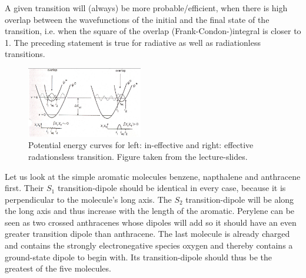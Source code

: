 \documentclass[10pt]{article}
\begin{document}
A given transition will (always) be more probable/efficient, when there is high overlap between the wavefunctions of the initial and the final state of the transition, i.e. when the square of the overlap (Frank-Condon-)integral is closer to 1. The preceding statement is true for radiative as well as radiationless transitions.
\begin{figure}[!h]
\begin{centering}
\includegraphics[width=0.45\textwidth]{f3}
\caption{Potential energy curves for left: in-effective and right: effective radationsless transition. Figure taken from the lecture-slides.}
\end{centering}
\end{figure}

Let us look at the simple aromatic molecules benzene, napthalene and anthracene first. Their $S_1$ transition-dipole should be identical in every case, because it is perpendicular to the molecule's long axis. The $S_2$ transition-dipole will be along the long axis and thus increase with the length of the aromatic. Perylene can be seen as two crossed anthracenes whose dipoles will add so it should have an even greater transition dipole than anthracene. The last molecule is already charged and contains the strongly electronegative species oxygen and thereby contains a ground-state dipole to begin with. Its transition-dipole should thus be the greatest of the five molecules.
\end{document}

